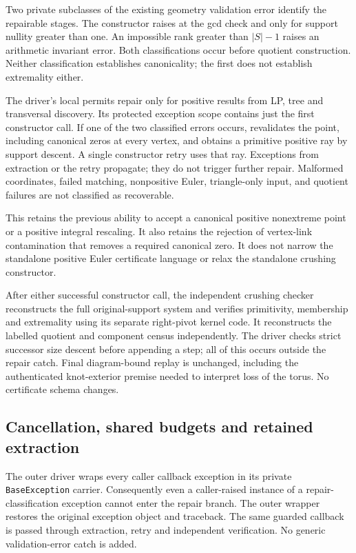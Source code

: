 Two private subclasses of the existing geometry validation error identify
the repairable stages.  The constructor raises
 at the gcd check and
 only for support nullity greater than one.
An impossible rank greater than $|S|-1$ raises an arithmetic invariant
error.  Both classifications occur before quotient construction.  Neither
classification establishes canonicality; the first does not establish
extremality either.

The driver's local  permits repair only for positive
results from LP, tree and transversal discovery.  Its protected exception
scope contains just the first constructor call.  If one of the two
classified errors occurs,  revalidates the
point, including canonical zeros at every vertex, and obtains a primitive
positive ray by support descent.  A single constructor retry uses that
ray.  Exceptions from extraction or the retry propagate; they do not
trigger further repair.  Malformed coordinates, failed matching,
nonpositive Euler, triangle-only input, and quotient failures are not
classified as recoverable.

This retains the previous ability to accept a canonical positive
nonextreme point or a positive integral rescaling.  It also retains the
rejection of vertex-link contamination that removes a required canonical
zero.  It does not narrow the standalone positive Euler certificate
language or relax the standalone crushing constructor.

After either successful constructor call, the independent crushing checker
reconstructs the full original-support system and verifies primitivity,
membership and extremality using its separate right-pivot kernel code.
It reconstructs the labelled quotient and component census independently.
The driver checks strict successor size descent before appending a step;
all of this occurs outside the repair catch.  Final diagram-bound replay
is unchanged, including the authenticated knot-exterior premise needed
to interpret loss of the torus.  No certificate schema changes.

\subsection{Cancellation, shared budgets and retained extraction}

The outer driver wraps every caller callback exception in its private
\texttt{BaseException} carrier.  Consequently even a caller-raised instance
of a repair-classification exception cannot enter the repair branch.
The outer wrapper restores the original exception object and traceback.
The same guarded callback is passed through extraction, retry and
independent verification.  No generic validation-error catch is added.

